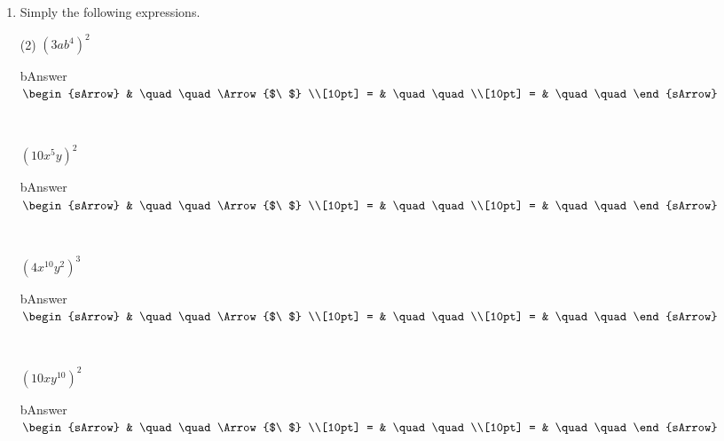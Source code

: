 \begin{enumerate}[resume]
  \item Simply the following expressions.
  \begin{subtask}(2)
    \task[] $ (3ab^4)^2  $
              \begin{envOut}[equal height group=A-Rev-1]{bAnswer}
			       $\begin{sArrow}
			             & \quad\quad       \Arrow{$\ $} \\[10pt]
                       = & \quad\quad               \\[10pt]      
					   = & \quad\quad  
	                \end{sArrow}$
              \end{envOut}
			  \begin{shortsolution}  
			     $ \quad \quad \quad \quad$
			\end{shortsolution}	
    \task[] $ (10 x^5 y)^2  $
              \begin{envOut}[equal height group=A-Rev-1]{bAnswer}
			       $\begin{sArrow}
			             & \quad\quad       \Arrow{$\ $} \\[10pt]
                       = & \quad\quad               \\[10pt]      
					   = & \quad\quad  
	                \end{sArrow}$
              \end{envOut}
			  \begin{shortsolution}  
			     $ \quad \quad \quad \quad$
			\end{shortsolution}	
    \task[] $ (4x^{10} y^2 )^3  $
              \begin{envOut}[equal height group=A-Rev-1]{bAnswer}
			       $\begin{sArrow}
			             & \quad\quad       \Arrow{$\ $} \\[10pt]
                       = & \quad\quad               \\[10pt]      
					   = & \quad\quad  
	                \end{sArrow}$
              \end{envOut}
			  \begin{shortsolution}  
			     $ \quad \quad \quad \quad$
			\end{shortsolution}	
    \task[] $ (10x y ^{10})^2  $
              \begin{envOut}[equal height group=A-Rev-1]{bAnswer}
			       $\begin{sArrow}
			             & \quad\quad       \Arrow{$\ $} \\[10pt]
                       = & \quad\quad               \\[10pt]      
					   = & \quad\quad  
	                \end{sArrow}$
              \end{envOut}
			  \begin{shortsolution}  
			     $ \quad \quad \quad \quad$
			\end{shortsolution}	   \end{subtask}   			
\end{enumerate}



